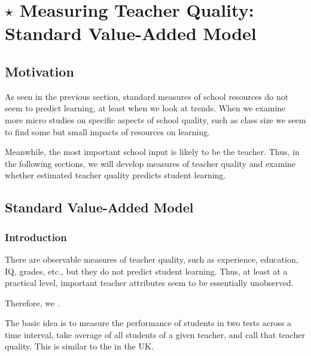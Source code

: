 \section{$\star$ Measuring Teacher Quality: Standard Value-Added Model}
    
    \subsection{Motivation}
        As seen in the previous section, standard measures of school resources do not seem to predict learning, at least when we look at trends. When we examine more micro studies on specific aspects of school quality, such as class size we seem to find some but small impacts of resources on learning.
        
        Meanwhile, the most important school input is likely to be the teacher. Thus, in the following sections, we will develop measures of teacher quality and examine whether estimated teacher quality predicts student learning.
        
    \subsection{Standard Value-Added Model}
        
        \subsubsection{Introduction}
            There are observable measures of teacher quality, such as experience, education, IQ, grades, etc., but they do not predict student learning. Thus, at least at a practical level, important teacher attributes seem to be essentially unobserved.
            
            Therefore, we .
            
            The basic idea is to measure the performance of students in two tests across a time interval, take average of all students of a given teacher, and call that teacher quality. This is similar to the  in the UK.

            
